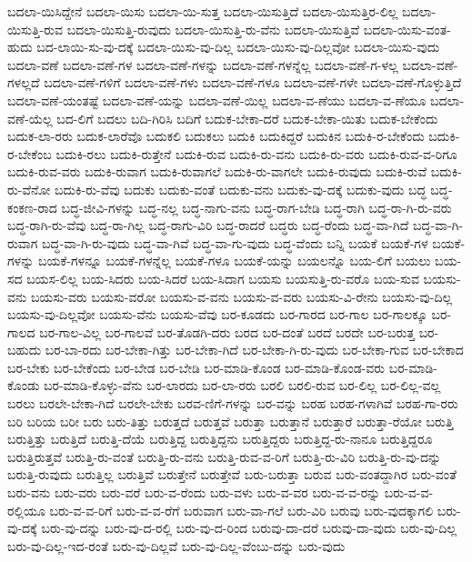 {ಬದಲಾ-ಯಿಸಿದ್ದೇನೆ
ಬದಲಾ-ಯಿಸು
ಬದಲಾ-ಯಿ-ಸುತ್ತ
ಬದಲಾ-ಯಿಸುತ್ತಿದೆ
ಬದಲಾ-ಯಿಸುತ್ತಿರ-ಲಿಲ್ಲ
ಬದಲಾ-ಯಿಸುತ್ತಿ-ರುವ
ಬದಲಾ-ಯಿಸುತ್ತಿ-ರುವುದು
ಬದಲಾ-ಯಿಸುತ್ತಿ-ರು-ವೆನು
ಬದಲಾ-ಯಿಸುತ್ತಿವೆ
ಬದಲಾ-ಯಿಸು-ವಂತ-ಹುದು
ಬದ-ಲಾಯಿ-ಸು-ವು-ದಕ್ಕೆ
ಬದಲಾ-ಯಿಸು-ವು-ದಿಲ್ಲ
ಬದಲಾ-ಯಿಸು-ವು-ದಿಲ್ಲವೋ
ಬದಲಾ-ಯಿಸು-ವುದು
ಬದಲಾ-ವಣೆ
ಬದಲಾ-ವಣೆ-ಗಳ
ಬದಲಾ-ವಣೆ-ಗಳನ್ನು
ಬದಲಾ-ವಣೆ-ಗಳನ್ನೆಲ್ಲ
ಬದಲಾ-ವಣೆ-ಗ-ಳಲ್ಲ
ಬದಲಾ-ವಣೆ-ಗಳಲ್ಲದೆ
ಬದಲಾ-ವಣೆ-ಗಳಿಗೆ
ಬದಲಾ-ವಣೆ-ಗಳು
ಬದಲಾ-ವಣೆ-ಗಳೂ
ಬದಲಾ-ವಣೆ-ಗಳೇ
ಬದಲಾ-ವಣೆ-ಗೊಳ್ಳುತ್ತಿದೆ
ಬದಲಾ-ವಣೆ-ಯಂತಷ್ಟೆ
ಬದಲಾ-ವಣೆ-ಯನ್ನು
ಬದಲಾ-ವಣೆ-ಯಿಲ್ಲ
ಬದಲಾ-ವ-ಣೆಯು
ಬದಲಾ-ವ-ಣೆಯೂ
ಬದಲಾ-ವಣೆ-ಯೆಲ್ಲ
ಬದ-ಲಿಗೆ
ಬದಲು
ಬದಿ-ಗಿರಿಸಿ
ಬದಿಗೆ
ಬದುಕ-ಬೇಕಾ-ದರೆ
ಬದುಕ-ಬೇಕಾ-ಯಿತು
ಬದುಕ-ಬೇಕೆಂದು
ಬದುಕ-ಲಾ-ರರು
ಬದುಕ-ಲಾರೆವೊ
ಬದುಕಲಿ
ಬದುಕಲು
ಬದುಕಿ
ಬದುಕಿದ್ದರೆ
ಬದುಕಿನ
ಬದುಕಿ-ರ-ಬೇಕೆಂದು
ಬದುಕಿ-ರ-ಬೇಕೆಂಬ
ಬದುಕಿ-ರಲು
ಬದುಕಿ-ರುತ್ತೇನೆ
ಬದುಕಿ-ರುವ
ಬದುಕಿ-ರು-ವನು
ಬದುಕಿ-ರು-ವರು
ಬದುಕಿ-ರುವ-ವ-ರಿಗೂ
ಬದುಕಿ-ರುವ-ವರು
ಬದುಕಿ-ರುವಾಗ
ಬದುಕಿ-ರುವಾಗಲೆ
ಬದುಕಿ-ರು-ವಾಗಲೇ
ಬದುಕಿ-ರುವುದು
ಬದುಕಿ-ರುವೆ
ಬದುಕಿ-ರು-ವೆನೋ
ಬದುಕಿ-ರು-ವೆವು
ಬದುಕು
ಬದುಕು-ವಂತೆ
ಬದುಕು-ವನು
ಬದುಕು-ವು-ದಕ್ಕೆ
ಬದುಕು-ವುದು
ಬದ್ಧ
ಬದ್ಧ-ಕಂಕಣ-ರಾದ
ಬದ್ಧ-ಜೀವಿ-ಗಳನ್ನು
ಬದ್ಧ-ನಲ್ಲ
ಬದ್ಧ-ನಾಗು-ವನು
ಬದ್ಧ-ರಾಗ-ಬೇಡಿ
ಬದ್ಧ-ರಾಗಿ
ಬದ್ಧ-ರಾ-ಗಿ-ರು-ವರು
ಬದ್ಧ-ರಾಗಿ-ರು-ವೆವು
ಬದ್ಧ-ರಾ-ಗಿಲ್ಲ
ಬದ್ಧ-ರಾಗು-ವಿರಿ
ಬದ್ಧ-ರಾದರೆ
ಬದ್ಧರು
ಬದ್ಧ-ರೆಂದು
ಬದ್ಧ-ವಾ-ಗಿದೆ
ಬದ್ಧ-ವಾ-ಗಿ-ರುವಾಗ
ಬದ್ಧ-ವಾ-ಗಿ-ರು-ವುದು
ಬದ್ಧ-ವಾ-ಗಿವೆ
ಬದ್ಧ-ವಾ-ಗು-ವುದು
ಬದ್ಧ-ವೆಂದು
ಬನ್ನಿ
ಬಯಕೆ
ಬಯಕೆ-ಗಳ
ಬಯಕೆ-ಗಳನ್ನು
ಬಯಕೆ-ಗಳನ್ನೂ
ಬಯಕೆ-ಗಳನ್ನೆಲ್ಲ
ಬಯಕೆ-ಗಳೂ
ಬಯಕೆ-ಯನ್ನು
ಬಯಲನ್ನೊ
ಬಯ-ಲಿಗೆ
ಬಯಲು
ಬಯ-ಸದ
ಬಯಸ-ಲಿಲ್ಲ
ಬಯ-ಸಿದರು
ಬಯ-ಸಿದರೆ
ಬಯ-ಸಿದಾಗ
ಬಯಸು
ಬಯಸುತ್ತಿ-ರು-ವರೊ
ಬಯ-ಸುವ
ಬಯಸು-ವನು
ಬಯಸು-ವರು
ಬಯಸು-ವರೋ
ಬಯಸು-ವ-ವನು
ಬಯಸು-ವ-ವರು
ಬಯಸು-ವಿ-ರೇನು
ಬಯಸು-ವು-ದಿಲ್ಲ
ಬಯಸು-ವು-ದಿಲ್ಲವೋ
ಬಯಸು-ವೆನು
ಬಯಸು-ವೆವು
ಬರ-ಕೂಡದು
ಬರ-ಗಾರದ
ಬರ-ಗಾಲ
ಬರ-ಗಾಲಕ್ಕೂ
ಬರ-ಗಾಲದ
ಬರ-ಗಾಲ-ವಿಲ್ಲ
ಬರ-ಗಾಲವೆ
ಬರ-ತೊಡಗಿ-ದರು
ಬರದ
ಬರ-ದಂತೆ
ಬರದೆ
ಬರದೇ
ಬರ-ಬರುತ್ತ
ಬರ-ಬಹುದು
ಬರ-ಬಾ-ರದು
ಬರ-ಬೇಕಾ-ಗಿತ್ತು
ಬರ-ಬೇಕಾ-ಗಿದೆ
ಬರ-ಬೇಕಾ-ಗಿ-ರು-ವುದು
ಬರ-ಬೇಕಾ-ಗುವ
ಬರ-ಬೇಕಾದ
ಬರ-ಬೇಕು
ಬರ-ಬೇಕೆಂದು
ಬರ-ಬೇಡ
ಬರ-ಬೇಡಿ
ಬರ-ಮಾಡಿ-ಕೊಂಡ
ಬರ-ಮಾಡಿ-ಕೊಂಡ-ವರು
ಬರ-ಮಾಡಿ-ಕೊಂಡು
ಬರ-ಮಾಡಿ-ಕೊಳ್ಳು-ವೆನು
ಬರ-ಲಾರದು
ಬರ-ಲಾ-ರರು
ಬರಲಿ
ಬರಲಿ-ರುವ
ಬರ-ಲಿಲ್ಲ
ಬರ-ಲಿಲ್ಲ-ವಲ್ಲ
ಬರಲು
ಬರಲೇ-ಬೇಕಾ-ಗಿದೆ
ಬರಲೇ-ಬೇಕು
ಬರವ-ಣಿಗೆ-ಗಳನ್ನು
ಬರ-ವನ್ನು
ಬರಹ
ಬರಹ-ಗಳಾಗಿವೆ
ಬರಹ-ಗಾ-ರರು
ಬರಿ
ಬರಿಯ
ಬರೀ
ಬರು
ಬರು-ತಿತ್ತು
ಬರುತ್ತದೆ
ಬರುತ್ತವೆ
ಬರುತ್ತಾ
ಬರುತ್ತಾನೆ
ಬರುತ್ತಾರೆ
ಬರುತ್ತಾ-ರೆಯೋ
ಬರುತ್ತಿ
ಬರುತ್ತಿತ್ತು
ಬರುತ್ತಿದೆ
ಬರುತ್ತಿ-ದೆಯೆ
ಬರುತ್ತಿದ್ದ
ಬರುತ್ತಿದ್ದನು
ಬರುತ್ತಿದ್ದರು
ಬರುತ್ತಿದ್ದ-ರು-ನಾನೂ
ಬರುತ್ತಿದ್ದರೂ
ಬರುತ್ತಿರುತ್ತವೆ
ಬರುತ್ತಿ-ರು-ವಂತೆ
ಬರುತ್ತಿ-ರು-ವನು
ಬರುತ್ತಿ-ರುವ-ವ-ರಿಗೆ
ಬರುತ್ತಿ-ರು-ವಿರಿ
ಬರುತ್ತಿ-ರು-ವು-ದನ್ನು
ಬರುತ್ತಿ-ರುವುದು
ಬರುತ್ತಿಲ್ಲ
ಬರುತ್ತಿವೆ
ಬರುತ್ತೇನೆ
ಬರುತ್ತೇವೆ
ಬರು-ಬರುತ್ತಾ
ಬರುವ
ಬರು-ವಂತದ್ದಾಗಿರ
ಬರು-ವಂತೆ
ಬರು-ವನು
ಬರು-ವರು
ಬರು-ವರೆ
ಬರು-ವ-ರೆಂದು
ಬರು-ವಳು
ಬರು-ವ-ವರ
ಬರು-ವ-ವ-ರನ್ನು
ಬರು-ವ-ವ-ರಲ್ಲಿಯೂ
ಬರು-ವ-ವ-ರಿಗೆ
ಬರು-ವ-ವ-ರೆಗೆ
ಬರುವಾಗ
ಬರು-ವಾ-ಗಲೆ
ಬರು-ವಿರಿ
ಬರುವು
ಬರು-ವುದಕ್ಕಾಗಲಿ
ಬರು-ವು-ದಕ್ಕೆ
ಬರು-ವು-ದನ್ನು
ಬರು-ವು-ದ-ರಲ್ಲಿ
ಬರು-ವು-ದ-ರಿಂದ
ಬರುವು-ದಾ-ದರೆ
ಬರುವು-ದಾ-ವುದು
ಬರು-ವು-ದಿಲ್ಲ
ಬರು-ವು-ದಿಲ್ಲ-ಇದ-ರಂತೆ
ಬರು-ವು-ದಿಲ್ಲವೆ
ಬರು-ವು-ದಿಲ್ಲ-ವೆಂಬು-ದನ್ನು
ಬರು-ವುದು
}
